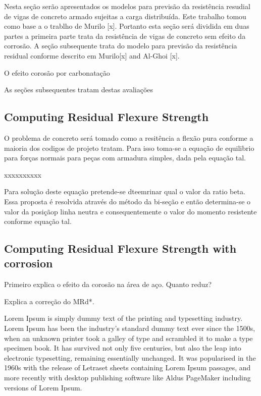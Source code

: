 Nesta seção serão apresentados os modelos para previsão da resistência resudial de vigas de concreto armado sujeitas a carga distribuída. Este trabalho tomou como base a o trablho de Murilo [x]. Portanto esta seção será dividida em duas partes a primeira parte trata da resistência de vigas de concreto sem efeito da corrosão. A seção subsequente trata do modelo para previsão da resistência residual conforme descrito em Murilo[x] and Al-Ghoi [x].

O efeito corosão por carbonatação

As seções subsequentes tratam destas avaliações


\subsection{Computing Residual Flexure Strength}

O problema de concreto será tomado como a resitência a flexão pura conforme a maioria dos codigos de projeto tratam. Para isso toma-se a equação de equilibrio para forças normais para peças com armadura simples, dada pela equação tal.

xxxxxxxxxx

Para solução deste equação pretende-se dteemrinar qual o valor da ratio beta. Essa proposta é resolvida através do método da bi-seção e então determina-se o valor da posiçãop linha neutra e consequentemente o valor do momento resistente conforme equação tal.

\subsection{Computing Residual Flexure Strength with corrosion}

Primeiro explica o efeito da corosão na área de aço. Quanto reduz?

Explica a correção do MRd*.



Lorem Ipsum is simply dummy text of the printing and typesetting industry. Lorem Ipsum has been the industry's standard dummy text ever since the 1500s, when an unknown printer took a galley of type and scrambled it to make a type specimen book. It has survived not only five centuries, but also the leap into electronic typesetting, remaining essentially unchanged. It was popularised in the 1960s with the release of Letraset sheets containing Lorem Ipsum passages, and more recently with desktop publishing software like Aldus PageMaker including versions of Lorem Ipsum.

